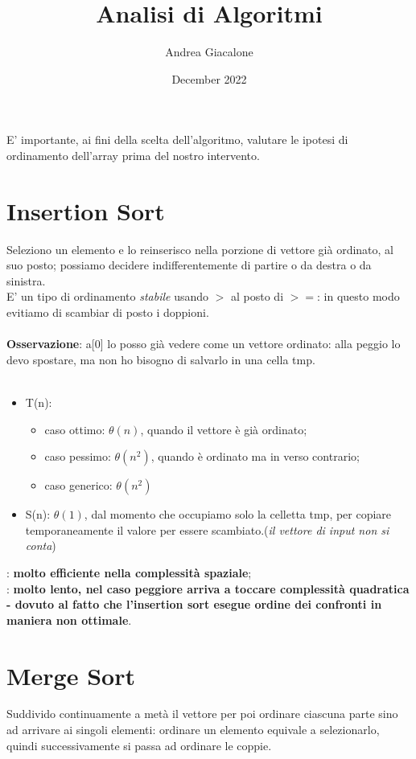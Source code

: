 \documentclass{article}
\title{Analisi di Algoritmi}
\author{Andrea Giacalone}
\date{December 2022}
\begin{document}
\maketitle
E' importante, ai fini della scelta dell'algoritmo, valutare le ipotesi di ordinamento dell'array prima del nostro intervento.
    \section{Insertion Sort}
    Seleziono un elemento e lo reinserisco nella porzione di vettore già ordinato, al suo posto; possiamo decidere indifferentemente di partire o da destra o da sinistra. \\
    E' un tipo di ordinamento \emph{stabile} usando $>$ al posto di $>=$: in questo modo evitiamo di scambiar di posto i doppioni.\\
\\
    \textbf{Osservazione}: a[0] lo posso già vedere come un vettore ordinato: alla peggio lo devo spostare, ma non ho bisogno di salvarlo in una cella tmp.\\
    \\

    \begin{itemize}
        \item T(n): \begin{itemize}
            \item caso ottimo: $\theta(n)$, quando il vettore è già ordinato;
            \item caso pessimo: $\theta(n^2)$, quando è ordinato ma in verso contrario;
            \item caso generico: $\theta(n^2)$
        \end{itemize}
        \item S(n): $\theta(1)$, dal momento che occupiamo solo la celletta tmp, per copiare temporaneamente il valore per essere scambiato.(\emph{il vettore di input non si conta})
    \end{itemize}

\smiley: \textbf{molto efficiente nella complessità spaziale};\\

\frownie: \textbf{molto lento, nel caso peggiore arriva a toccare complessità quadratica - dovuto al fatto che l'insertion sort esegue ordine dei confronti in maniera non ottimale}.\\

    \section{Merge Sort}
    Suddivido continuamente a metà il vettore per poi ordinare ciascuna parte sino ad arrivare ai singoli elementi: ordinare un elemento equivale a selezionarlo, quindi successivamente si passa ad ordinare le coppie.\\
    
\end{document}
